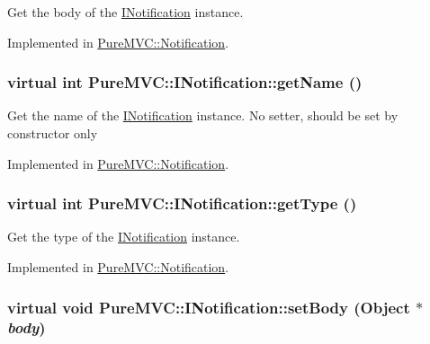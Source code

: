 Get the body of the {\ttfamily \hyperlink{class_pure_m_v_c_1_1_i_notification}{INotification}} instance. 

Implemented in \hyperlink{class_pure_m_v_c_1_1_notification_a57b45067ffdee2037305396e190f83b9}{PureMVC::Notification}.\hypertarget{class_pure_m_v_c_1_1_i_notification_a47236c554cb055f0d422270abc65778b}{
\subsubsection[{getName}]{\setlength{\rightskip}{0pt plus 5cm}virtual int PureMVC::INotification::getName ()}}
\label{class_pure_m_v_c_1_1_i_notification_a47236c554cb055f0d422270abc65778b}


Get the name of the {\ttfamily \hyperlink{class_pure_m_v_c_1_1_i_notification}{INotification}} instance. No setter, should be set by constructor only 

Implemented in \hyperlink{class_pure_m_v_c_1_1_notification_aed76b38c526e916005fb55fc3d9f714f}{PureMVC::Notification}.\hypertarget{class_pure_m_v_c_1_1_i_notification_a40c8210a691d342cedcb558beef3ef52}{
\subsubsection[{getType}]{\setlength{\rightskip}{0pt plus 5cm}virtual int PureMVC::INotification::getType ()}}
\label{class_pure_m_v_c_1_1_i_notification_a40c8210a691d342cedcb558beef3ef52}


Get the type of the {\ttfamily \hyperlink{class_pure_m_v_c_1_1_i_notification}{INotification}} instance. 

Implemented in \hyperlink{class_pure_m_v_c_1_1_notification_a05e70c01afdee0dbaff570789ee761b1}{PureMVC::Notification}.\hypertarget{class_pure_m_v_c_1_1_i_notification_a3f5eab942b48a0a8d8045701ed98de83}{
\subsubsection[{setBody}]{\setlength{\rightskip}{0pt plus 5cm}virtual void PureMVC::INotification::setBody ({\bf Object} $\ast$ {\em body})}}
\label{class_pure_m_v_c_1_1_i_notification_a3f5eab942b48a0a8d8045701ed98de83}


